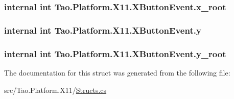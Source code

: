 \hypertarget{struct_tao_1_1_platform_1_1_x11_1_1_x_button_event_a301e4f77938c9a062ccc3f44969d87d0}{
\subsubsection[{x\_\-root}]{\setlength{\rightskip}{0pt plus 5cm}internal int {\bf Tao.Platform.X11.XButtonEvent.x\_\-root}}}
\label{struct_tao_1_1_platform_1_1_x11_1_1_x_button_event_a301e4f77938c9a062ccc3f44969d87d0}
\hypertarget{struct_tao_1_1_platform_1_1_x11_1_1_x_button_event_a64dc4ae7e732db542440c4d4782f0baf}{
\subsubsection[{y}]{\setlength{\rightskip}{0pt plus 5cm}internal int {\bf Tao.Platform.X11.XButtonEvent.y}}}
\label{struct_tao_1_1_platform_1_1_x11_1_1_x_button_event_a64dc4ae7e732db542440c4d4782f0baf}
\hypertarget{struct_tao_1_1_platform_1_1_x11_1_1_x_button_event_a1aceecd530143c23dcbb0fffd6f538fe}{
\subsubsection[{y\_\-root}]{\setlength{\rightskip}{0pt plus 5cm}internal int {\bf Tao.Platform.X11.XButtonEvent.y\_\-root}}}
\label{struct_tao_1_1_platform_1_1_x11_1_1_x_button_event_a1aceecd530143c23dcbb0fffd6f538fe}


The documentation for this struct was generated from the following file:\begin{DoxyCompactItemize}
\item 
src/Tao.Platform.X11/\hyperlink{_structs_8cs}{Structs.cs}\end{DoxyCompactItemize}
